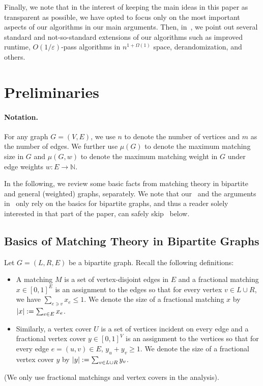\documentclass{article}
\renewcommand{\leq}{\leqslant}
\renewcommand{\geq}{\geqslant}
\DeclarePairedDelimiter{\card}{\vert}{\vert}
\newcommand{\eps}{\varepsilon}
\newcommand{\IN}{\mathbb{N}}
\begin{document}
Finally, we note that in the interest of keeping the main ideas in this paper as transparent as possible, we have opted to focus only on the most important aspects of our algorithms 
in our main arguments. Then, in~, we point out several standard and not-so-standard extensions of our algorithms such as improved runtime, $O(1/\eps)$-pass algorithms in $n^{1+\Omega(1)}$ space, derandomization,  and others.


\newcommand{\qe}[1]{\ensuremath{q^{(#1)}}}
\newcommand{\Qe}[1]{\ensuremath{Q^{(#1)}}}

\newcommand{\pe}[1]{\ensuremath{p^{(#1)}}}

\newcommand{\UU}{\ensuremath{\mathcal{U}}}

\section{Preliminaries}\label{sec:prelim}

\paragraph{Notation.} For any graph $G=(V,E)$, we use $n$ to denote the number of vertices and $m$ as the number of edges. 
We further use $\mu(G)$ to denote the maximum matching size in $G$ and $\mu(G,w)$ to denote the maximum matching weight in $G$ under edge weights $w: E \rightarrow \IN$. 


In the following, we review some basic facts from matching theory in bipartite and general (weighted) graphs, separately. We note that our~ and the arguments in~ only 
rely on the basics for bipartite graphs, and thus a reader solely interested in that part of the paper, can safely skip~ below. 

\subsection{Basics of Matching Theory in Bipartite Graphs}\label{sec:basics-bipartite}

Let $G=(L,R,E)$ be a bipartite graph. Recall the following definitions: 
\begin{itemize}
\item A matching $M$ is a set of vertex-disjoint edges in $E$ and a fractional matching $x \in [0,1]^E$ is an assignment to the edges 
so that for every vertex $v \in L \cup R$, we have $\sum_{e \ni v} x_e \leq 1$. We denote the size of a fractional matching $x$ by $\card{x} := \sum_{e \in E} x_e$. 
\item Similarly, a vertex cover $U$ is a set of vertices incident on every edge and a fractional vertex cover $y \in [0,1]^V$ is an assignment to the vertices so that for every edge $e=(u,v) \in E$, $y_u + y_v \geq 1$. 
We denote the size of a fractional vertex cover $y$ by $\card{y} := \sum_{v \in L \cup R} y_v$. 
\end{itemize}
(We only use fractional matchings and vertex covers  in the analysis). 
\end{document}
